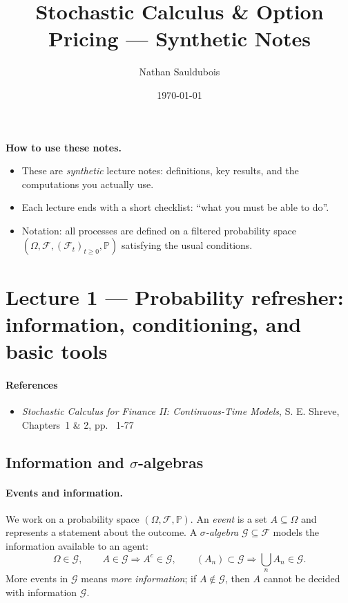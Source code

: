 \documentclass[11pt]{article}
\title{Stochastic Calculus \& Option Pricing --- Synthetic Notes}
\author{Nathan Sauldubois}
\date{\today}
\newcommand{\F}{\mathcal{F}}
\newcommand{\Pbb}{\mathbb{P}}
\newcommand{\1}{\mathbf{1}}
\theoremstyle{plain}
\theoremstyle{definition}
\theoremstyle{remark}
\begin{document}
\maketitle
\vspace{-0.8em}

\noindent\textbf{How to use these notes.}
\begin{itemize}[leftmargin=1.4em, itemsep=0.2em]
  \item These are \emph{synthetic} lecture notes: definitions, key results, and the computations you actually use.
  \item Each lecture ends with a short checklist: ``what you must be able to do''.
  \item Notation: all processes are defined on a filtered probability space $(\Omega,\F,(\F_t)_{t\ge 0},\Pbb)$ satisfying the usual conditions.
\end{itemize}

\tableofcontents
\bigskip


\section{Lecture 1 --- Probability refresher: information, conditioning, and basic tools}

\paragraph{References}

\begin{itemize}[leftmargin=1.4em]

\item \textit{Stochastic Calculus for Finance II: Continuous-Time Models}, S. E. Shreve, Chapters~1 \& 2, pp.~ 1-77

\end{itemize}


\subsection{Information and $\sigma$-algebras}

\paragraph{Events and information.}
We work on a probability space $(\Omega,\mathcal F,\Pbb)$.
An \emph{event} is a set $A\subseteq\Omega$ and represents a statement about the outcome.
A \emph{$\sigma$-algebra} $\mathcal G\subseteq\mathcal F$ models the information available to an agent:
\[
\Omega\in\mathcal G,\qquad A\in\mathcal G \Rightarrow A^c\in\mathcal G,\qquad (A_n)\subset\mathcal G \Rightarrow \bigcup_n A_n\in\mathcal G.
\]
More events in $\mathcal G$ means \emph{more information}; if $A\notin\mathcal G$, then $A$ cannot be decided with information $\mathcal G$.
\end{document}
